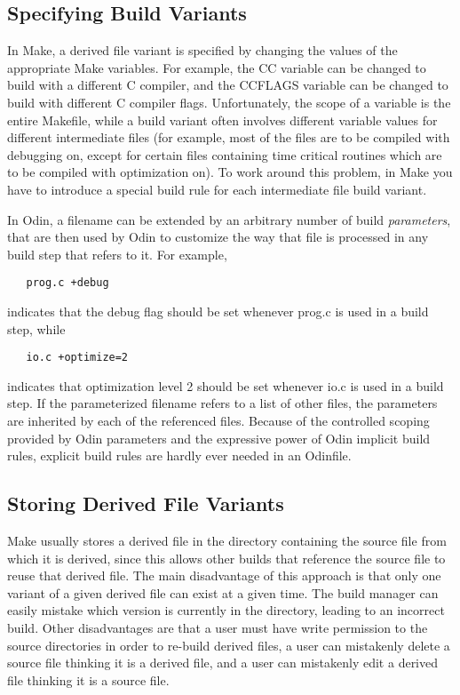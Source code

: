 \subsection{Specifying Build Variants}

In Make, a derived file variant is specified by changing the values
of the appropriate Make variables.
For example, the {\ex CC} variable can be changed to build with
a different C compiler,
and the {\ex CCFLAGS} variable can be changed to build with different
C compiler flags.
Unfortunately, the scope of a variable is the entire Makefile,
while a build variant often involves different variable values
for different intermediate files (for example, most of the files are
to be compiled with debugging on, except for certain files containing
time critical routines which are to be compiled with optimization on).
To work around this problem, in Make you have to introduce a special build
rule for each intermediate file build variant.

In Odin, a filename can be extended by an arbitrary number of build
{\em parameters}, that are then used by Odin to customize the way
that file is processed in any build step that refers to it.
For example,
\begin{verbatim}
   prog.c +debug
\end{verbatim}
indicates that the debug flag should be set whenever {\ex prog.c}
is used in a build step, while
\begin{verbatim}
   io.c +optimize=2
\end{verbatim}
indicates that optimization level 2 should be set whenever {\ex io.c}
is used in a build step.
If the parameterized filename refers to a list of other files,
the parameters are inherited by each of the referenced files.
Because of the controlled scoping provided by Odin parameters
and the expressive power of Odin implicit build rules,
explicit build rules are hardly ever needed in an Odinfile.

\subsection{Storing Derived File Variants}

Make usually stores a derived file in the directory containing the source
file from which it is derived,
since this allows other builds that reference the source file
to reuse that derived file.
The main disadvantage of this approach is that only
one variant of a given derived file can exist at a given time.
The build manager can easily mistake which version is
currently in the directory, leading to an incorrect build.
Other disadvantages are that a user must have write permission
to the source directories in order to re-build derived files,
a user can mistakenly delete a source file thinking it is a derived file,
and a user can mistakenly edit a derived file thinking it is a source file.

